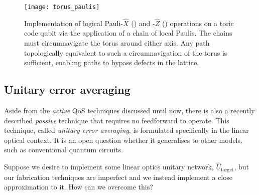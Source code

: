 \begin{figure}[htpb]
	\texttt{[image: torus\_paulis]}
	\caption{Implementation of logical Pauli-$\hat{X}$ () and -$\hat{Z}$ () operations on a toric code qubit via the application of a chain of local Paulis. The chains must circumnavigate the torus around either axis. Any path topologically equivalent to such a circumnavigation of the torus is sufficient, enabling paths to bypass defects in the lattice.} \label{fig:toric_code_paulis}
\end{figure}









%
%

\subsection{Unitary error averaging} \label{sec:error_averaging}

Aside from the \textit{active} QoS techniques discussed until now, there is also a recently described \textit{passive} technique that requires no feedforward to operate. This technique, called \textit{unitary error averaging}, is formulated specifically in the linear optical context. It is an open question whether it generalises to other models, such as conventional quantum circuits.

Suppose we desire to implement some linear optics unitary network, $\hat{U}_\mathrm{target}$, but our fabrication techniques are imperfect and we instead implement a close approximation to it. How can we overcome this?

